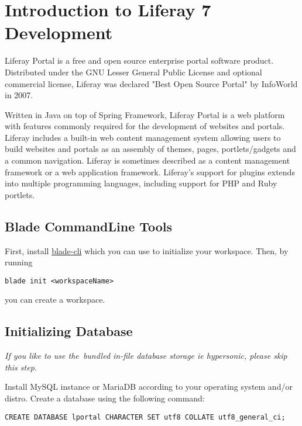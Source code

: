 \section{Introduction to Liferay 7 Development}

Liferay Portal is a free and open source enterprise portal software product. Distributed under the GNU Lesser General Public License and optional commercial license, Liferay was declared "Best Open Source Portal" by InfoWorld in 2007.

Written in Java on top of Spring Framework, Liferay Portal is a web platform with features commonly required for the development of websites and portals. Liferay includes a built-in web content management system allowing users to build websites and portals as an assembly of themes, pages, portlets/gadgets and a common navigation. Liferay is sometimes described as a content management framework or a web application framework. Liferay's support for plugins extends into multiple programming languages, including support for PHP and Ruby portlets.

\subsection{Blade CommandLine Tools}
First, install \href{https://dev.liferay.com/develop/tutorials/-/knowledge_base/7-0/installing-blade-cli}{blade-cli} which you can use to initialize your workspace. Then, by running

\begin{lstlisting}
blade init <workspaceName>
\end{lstlisting}

you can create a workspace.

\subsection{Initializing Database}
\textit{If you like to use the bundled in-file database storage ie hypersonic, please skip this step.}

Install MySQL instance or MariaDB according to your operating system and/or distro. Create a database using the following command:

\lstset{language=sql}
\begin{lstlisting}
CREATE DATABASE lportal CHARACTER SET utf8 COLLATE utf8_general_ci;
\end{lstlisting}

